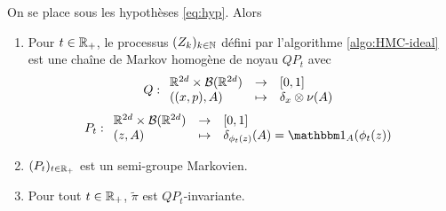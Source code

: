 \documentclass[10pt,a4paper]{article}
\begin{document}
\begin{Prop}\label{prop:inv-ideal}
	On se place sous les hypothèses \eqref{eq:hyp}. Alors

	\begin{enumerate}
		\item Pour $t \in \mathbb{R}_+$, le processus $(Z_k)_{k \in \mathbb{N}}$ défini par l'algorithme \ref{algo:HMC-ideal} est une chaîne de Markov homogène de noyau $QP_t$ avec
		$$
		Q : { \begin{array}{lcl} 
		\mathbb{R}^{2d} \times \mathcal{B}(\mathbb{R}^{2d}) & \to & [0,1] \\
		((x,p), A) & \mapsto & \delta_x \otimes \nu(A)
		 \end{array} }
		$$
		$$
		P_t : \fundef{
		\rset^{2d} \times \calB(\rset^{2d}) & \to & [0,1] \\
		(z, A) & \mapsto & \delta_{\phi_t(z)}(A) = \ind_A(\phi_t(z))
		}
		$$
		\item $(P_t)_{t \in \mathbb{R}_+}$ est un semi-groupe Markovien.
		\item Pour tout $t \in \mathbb{R}_+$, $\widetilde{\pi}$ est $QP_t$-invariante. 
	\end{enumerate}
\end{Prop}
\end{document}
